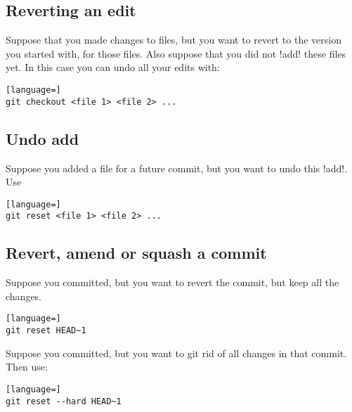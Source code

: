 \subsection{Reverting an edit}

Suppose that you made changes to files, but you want to revert to the version
you started with, for those files. Also suppose that you did not !add! these
files yet. In this case you can undo all your edits with:


\begin{lstlisting}[language=]
git checkout <file 1> <file 2> ...
\end{lstlisting}

\subsection{Undo add}

Suppose you added a file for a future commit, but you want to undo this !add!.
Use


\begin{lstlisting}[language=]
git reset <file 1> <file 2> ...
\end{lstlisting}

\subsection{Revert, amend or squash a commit}

Suppose you committed, but you want to revert the commit, but keep all the
changes.


\begin{lstlisting}[language=]
git reset HEAD~1
\end{lstlisting}

\noindent
Suppose you committed, but you want to git rid of all changes in that commit.
Then use:


\begin{lstlisting}[language=]
git reset --hard HEAD~1
\end{lstlisting}

